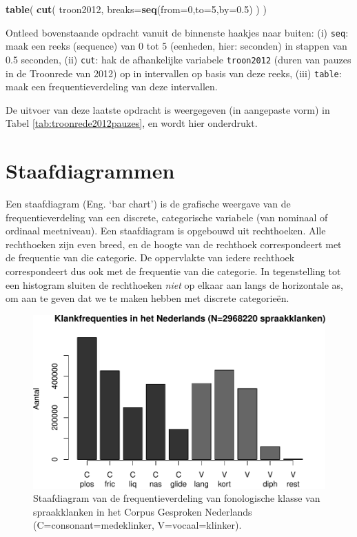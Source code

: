 \documentclass[
]{book}
\newenvironment{Shaded}{\begin{snugshade}}{\end{snugshade}}
\newcommand{\DataTypeTok}[1]{\textcolor[rgb]{0.13,0.29,0.53}{#1}}
\newcommand{\DecValTok}[1]{\textcolor[rgb]{0.00,0.00,0.81}{#1}}
\newcommand{\FloatTok}[1]{\textcolor[rgb]{0.00,0.00,0.81}{#1}}
\newcommand{\KeywordTok}[1]{\textcolor[rgb]{0.13,0.29,0.53}{\textbf{#1}}}
\newcommand{\NormalTok}[1]{#1}
\begin{document}
\begin{Shaded}
\begin{Highlighting}[]
\KeywordTok{table}\NormalTok{( }\KeywordTok{cut}\NormalTok{( troon2012, }\DataTypeTok{breaks=}\KeywordTok{seq}\NormalTok{(}\DataTypeTok{from=}\DecValTok{0}\NormalTok{,}\DataTypeTok{to=}\DecValTok{5}\NormalTok{,}\DataTypeTok{by=}\FloatTok{0.5}\NormalTok{) ) )}
\end{Highlighting}
\end{Shaded}

Ontleed bovenstaande opdracht vanuit de binnenste haakjes naar buiten:
(i) \texttt{seq}: maak een reeks (sequence) van 0 tot 5 (eenheden, hier: seconden) in stappen van 0.5 seconden,
(ii) \texttt{cut}: hak de afhankelijke variabele \texttt{troon2012} (duren van pauzes in de Troonrede van 2012) op in intervallen op basis van deze reeks,
(iii) \texttt{table}: maak een frequentieverdeling van deze intervallen.

De uitvoer van deze laatste opdracht is weergegeven (in aangepaste vorm) in Tabel \ref{tab:troonrede2012pauzes}, en wordt hier onderdrukt.

\hypertarget{sec:staafdiagrammen}{%
\section{Staafdiagrammen}\label{sec:staafdiagrammen}}

Een staafdiagram (Eng. `bar chart') is de grafische weergave van de
frequentieverdeling van een discrete, categorische variabele (van
nominaal of ordinaal meetniveau). Een staafdiagram is opgebouwd uit
rechthoeken. Alle rechthoeken zijn even breed, en de hoogte van de
rechthoek correspondeert met de frequentie van die categorie. De
oppervlakte van iedere rechthoek correspondeert dus ook met de
frequentie van die categorie. In tegenstelling tot een histogram sluiten
de rechthoeken \emph{niet} op elkaar aan langs de horizontale as, om aan te
geven dat we te maken hebben met discrete categorieën.

\begin{figure}
\centering
\includegraphics{KMS-NL_files/figure-latex/klankfreq-barplot-1.pdf}
\caption{\label{fig:klankfreq-barplot}Staafdiagram van de frequentieverdeling van fonologische klasse van spraakklanken in het Corpus Gesproken Nederlands (C=consonant=medeklinker, V=vocaal=klinker).}
\end{figure}
\end{document}
